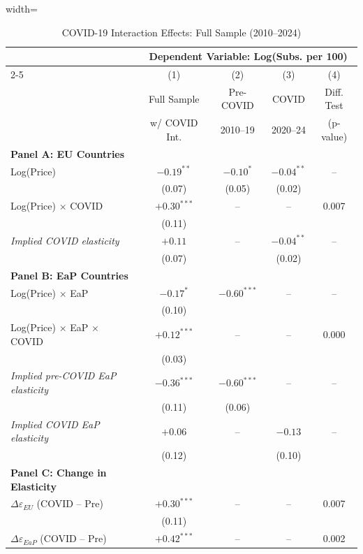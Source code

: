 \begin{table}[!htbp]
\centering
\caption{COVID-19 Interaction Effects: Full Sample (2010--2024)}
\label{tab:covid}
\begin{minipage}{\textwidth}
\begin{adjustbox}{width=\textwidth}
\scriptsize
\setlength{\tabcolsep}{3pt}
\renewcommand{\arraystretch}{0.85}
\begin{tabular}{@{}lcccc@{}}
\toprule
& \multicolumn{4}{c}{Dependent Variable: Log(Subs. per 100)} \\
\cmidrule(lr){2-5}
& (1) & (2) & (3) & (4) \\
& Full Sample & Pre-COVID & COVID & Diff. Test \\
& w/ COVID Int. & 2010--19 & 2020--24 & (p-value) \\
\midrule
\textbf{Panel A: EU Countries} \\
Log(Price) & $-0.19^{**}$ & $-0.10^{*}$ & $-0.04^{**}$ & -- \\
& (0.07) & (0.05) & (0.02) & \\[2pt]
Log(Price) $\times$ COVID & $+0.30^{***}$ & -- & -- & 0.007 \\
& (0.11) & & & \\[2pt]
\textit{Implied COVID elasticity} & $+0.11$ & -- & $-0.04^{**}$ & -- \\
& (0.07) & & (0.02) & \\
\midrule
\textbf{Panel B: EaP Countries} \\
Log(Price) $\times$ EaP & $-0.17^{*}$ & $-0.60^{***}$ & -- & -- \\
& (0.10) & & & \\[2pt]
Log(Price) $\times$ EaP $\times$ COVID & $+0.12^{***}$ & -- & -- & 0.000 \\
& (0.03) & & & \\[2pt]
\textit{Implied pre-COVID EaP elasticity} & $-0.36^{***}$ & $-0.60^{***}$ & -- & -- \\
& (0.11) & (0.06) & & \\[2pt]
\textit{Implied COVID EaP elasticity} & $+0.06$ & -- & $-0.13$ & -- \\
& (0.12) & & (0.10) & \\
\midrule
\textbf{Panel C: Change in Elasticity} \\
$\Delta\varepsilon_{EU}$ (COVID -- Pre) & $+0.30^{***}$ & -- & -- & 0.007 \\
& (0.11) & & & \\
$\Delta\varepsilon_{EaP}$ (COVID -- Pre) & $+0.42^{***}$ & -- & -- & 0.002 \\

\end{tabular}
\end{adjustbox}
\end{minipage}
\end{table}
